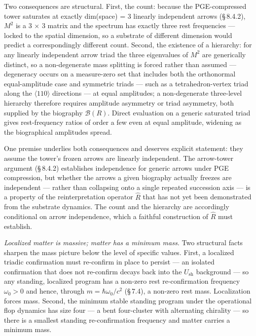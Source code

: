 \documentclass[11pt,oneside]{report}
\theoremstyle{definition}
\theoremstyle{remark}
\begin{document}
Two consequences are structural. First, the count: because the
PGE-compressed tower saturates at exactly dim(space) = 3 linearly
independent arrows (\S\,8.4.2), \ensuremath{M^{2}} is a 3 \ensuremath{\times} 3 matrix and the spectrum has
exactly three rest frequencies --- locked to the spatial dimension, so a
substrate of different dimension would predict a correspondingly
different count. Second, the existence of a hierarchy: for any linearly
independent arrow triad the three eigenvalues of \ensuremath{M^{2}} are generically
distinct, so a non-degenerate mass splitting is forced rather than
assumed --- degeneracy occurs on a measure-zero set that includes both
the orthonormal equal-amplitude case and symmetric triads --- such as a
tetrahedron-vertex triad along the \ensuremath{\langle 110\rangle} directions --- at equal
amplitudes; a non-degenerate three-level hierarchy therefore requires
amplitude asymmetry or triad asymmetry, both supplied by the biography
\ensuremath{\mathcal{B}(R)}. Direct evaluation on a generic saturated triad gives
rest-frequency ratios of order a few even at equal amplitude, widening as
the biographical amplitudes spread.

One premise underlies both consequences and deserves explicit statement:
they assume the tower's frozen arrows are linearly independent. The
arrow-tower argument (\S\,8.4.2) establishes independence for generic
arrows under PGE compression, but whether the arrows a given biography
actually freezes are independent --- rather than collapsing onto a
single repeated succession axis --- is a property of the
reinterpretation operator \ensuremath{\hat{R}} that has not yet been demonstrated from the
substrate dynamics. The count and the hierarchy are accordingly
conditional on arrow independence, which a faithful construction of \ensuremath{\hat{R}}
must establish.

\emph{Localized matter is massive; matter has a minimum mass.} Two
structural facts sharpen the mass picture below the level of specific
values. First, a localized triadic confirmation must re-confirm in place
to persist --- an isolated confirmation that does not re-confirm decays
back into the \ensuremath{U_{\mathrm{sh}}} background --- so any standing, localized program has a
non-zero rest re-confirmation frequency \ensuremath{\omega_0 > 0} and hence, through
\ensuremath{m = \hbar\omega_0/c^2} (\S\,7.4), a non-zero rest mass. Localization forces
mass. Second, the minimum stable standing program under the operational
flop dynamics has size four --- a bent four-cluster with alternating
chirality --- so there is a smallest standing re-confirmation frequency
and matter carries a minimum mass.
\end{document}
